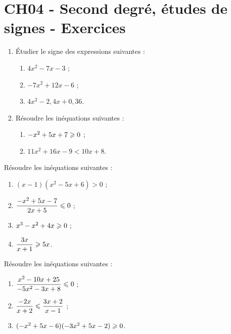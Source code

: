 \documentclass[a4paper,11pt]{article}
\author{Pierquet}
\title{\nomfichier}
\begin{document}
\pagestyle{fancy}

\part{CH04 - Second degré, études de signes - Exercices}

\smallskip

%
\begin{enumerate}
	\item Étudier le signe des expressions suivantes :
	\begin{enumerate}
		\item $4x^2-7x-3$ ;
		\item $-7x^2+12x-6$ ;
		\item $4x^2-2,4x+0,36$.
	\end{enumerate}
	\item Résoudre les inéquations suivantes :
	\begin{enumerate}
		\item $-x^2+5x+7 \geqslant 0$ ;
		\item $11x^2+16x-9<10x+8$.
	\end{enumerate}
\end{enumerate}

\medskip


\medskip

Résoudre les inéquations suivantes :
%
\begin{enumerate}
	\item $(x-1)(x^2-5x+6)>0$ ;
	\item $\dfrac{-x^2+5x-7}{2x+5} \leqslant 0$ ;
	\item $x^3-x^2+4x \geqslant 0$ ;
	\item $\dfrac{3x}{x+1} \geqslant 5x$.
\end{enumerate}

\medskip


\medskip

Résoudre les inéquations suivantes :
%
\begin{enumerate}
	\item $\dfrac{x^2-10x+25}{-5x^2-3x+8} \leqslant 0$ ;
	\item $\dfrac{-2x}{x+2} \leqslant \dfrac{3x+2}{x-1}$ ;
	\item $(-x^2+5x-6)(-3x^2+5x-2) \geqslant 0$.
\end{enumerate}

\medskip

\end{document}
